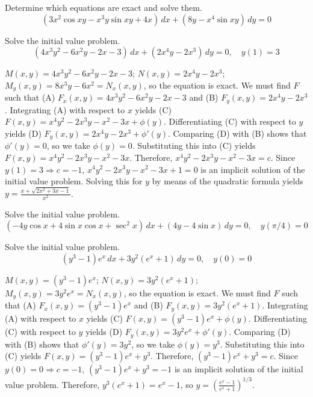 \documentclass{ximera}
\begin{document}
\begin{problem}\label{exer:2.5.17} Determine which equations are exact and solve them.
$$(3x^2\cos xy-x^3y\sin xy+4x)\,dx+(8y-x^4\sin xy)\,dy=0$$
\end{problem}

\begin{problem}\label{exer:2.5.18} Solve the initial value problem.
$$(4x^3y^2-6x^2y-2x-3)\,dx+(2x^4y-2x^3)\,dy=0,\quad y(1)=3$$



\begin{solution}
    $M(x,y)=4x^3y^2-6x^2y-2x-3$;\;
$N(x,y)=2x^4y-2x^3$;\;
$M_y(x,y)=8x^3y-6x^2=N_x(x,y)$,
so the  equation is exact.
We must find $F$ such that
(A) $F_x(x,y)=4x^3y^2-6x^2y-2x-3$ and
(B) $F_y(x,y)=2x^4y-2x^3$.
Integrating (A) with respect to $x$ yields
(C) $F(x,y)=x^4y^2-2x^3y-x^2-3x+\phi(y)$.
Differentiating (C) with respect to $y$  yields
(D) $F_y(x,y)=2x^4y-2x^3+\phi'(y)$.
Comparing (D) with (B)  shows that
$\phi'(y)=0$, so we take
$\phi(y)=0$.
Substituting this into (C) yields
$F(x,y)=x^4y^2-2x^3y-x^2-3x$.
Therefore, $x^4y^2-2x^3y-x^2-3x=c$.
Since $y(1)=3\Rightarrow c=-1$,
$x^4y^2-2x^3y-x^2-3x+1=0$ is an implicit solution of the initial
value problem. Solving this for $y$ by means of the quadratic formula
yields $y=\frac{x+\sqrt{2x^2+3x-1}}{x^2}$.
\end{solution}
\end{problem}

\begin{problem}\label{exer:2.5.19} Solve the initial value problem.
$$(-4y\cos x+4\sin x\cos x+\sec^2x)\,dx+
(4y-4\sin x)\,dy=0,\quad y(\pi/4)=0$$
\end{problem}

\begin{problem}\label{exer:2.5.20} Solve the initial value problem.
$$(y^3-1)e^x\,dx+3y^2(e^x+1)\,dy=0,\quad y(0)=0$$



\begin{solution}
    $M(x,y)=(y^3-1)e^x$;\;
$N(x,y)=3y^2(e^x+1)$;\;
$M_y(x,y)=3y^2e^x=N_x(x,y)$,
so the  equation is exact.
We must find $F$ such that
(A) $F_x(x,y)=(y^3-1)e^x$ and
(B) $F_y(x,y)=3y^2(e^x+1)$.
Integrating (A) with respect to $x$ yields
(C) $F(x,y)=(y^3-1)e^x+\phi(y)$.
Differentiating (C) with respect to $y$  yields
(D) $F_y(x,y)=3y^2e^x+\phi'(y)$.
Comparing (D) with (B)  shows that
$\phi'(y)=3y^2$, so we take
$\phi(y)=y^3$.
Substituting this into (C) yields
$F(x,y)=(y^3-1)e^x+y^3$.
Therefore, $(y^3-1)e^x+y^3=c$.
Since $y(0)=0\Rightarrow c=-1$,
$(y^3-1)e^x+y^3=-1$ is an implicit solution of  the initial value
problem. Therefore, $y^3(e^x+1)=e^x-1$, so
$y=\left(\frac{e^x-1}{e^x+1}\right)^{1/3}$.
\end{solution}
\end{problem}
\end{document}
